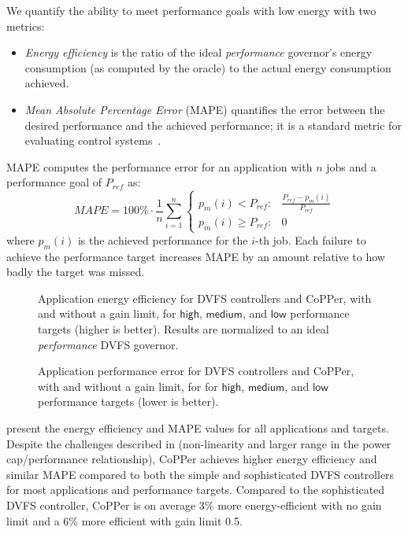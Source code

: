 We quantify the ability to meet performance goals with low energy with two metrics:
\begin{itemize}
\item \emph{Energy efficiency} is the ratio of the ideal \emph{performance} governor's energy consumption (as computed by the oracle) to the actual energy consumption achieved.  
\item \emph{Mean Absolute Percentage Error} (MAPE) quantifies the error between the desired performance and the achieved performance; it is a standard metric for evaluating control systems~\cite{ICSE2014}.  
\end{itemize}
MAPE computes the performance error for an application with $n$ jobs and a performance goal of $P_{ref}$ as:
\begin{equation}
MAPE = 100\% \cdot \frac{1}{n} \sum\limits_{i=1}^{n} 
\left \{
\begin{array}{ll}
p_m(i) < P_{ref}  :& \frac{P_{ref} - p_m(i)}{P_{ref}} \\
p_m(i) \ge P_{ref}  :& 0
\end{array} \right.
\end{equation}
where $p_m(i)$ is the achieved performance for the $i$-th job.
Each failure to achieve the performance target increases MAPE by an amount relative to how badly the target was missed.

\begin{figure*}[t]
  \centering
  
  \caption{Application energy efficiency for DVFS controllers and CoPPer, with and without a gain limit, for $\mathsf{high}$, $\mathsf{medium}$, and $\mathsf{low}$ performance targets (higher is better).
  Results are normalized to an ideal \emph{performance} DVFS governor.}
  \label{fig:copper-ee}
\end{figure*}

\begin{figure*}[t]
  \centering
  
  \caption{Application performance error for DVFS controllers and CoPPer, with and without a gain limit, for for $\mathsf{high}$, $\mathsf{medium}$, and $\mathsf{low}$ performance targets (lower is better).}
  \label{fig:copper-mape}
\end{figure*}

 present the energy efficiency and MAPE values for all applications and targets.
Despite the challenges described in  (\eg non-linearity and larger range in the power cap/performance relationship), CoPPer achieves higher energy efficiency and similar MAPE compared to both the simple and sophisticated DVFS controllers for most applications and performance targets.
Compared to the sophisticated DVFS controller, CoPPer is on average 3\% more energy-efficient with no gain limit and a 6\% more efficient with gain limit 0.5.

